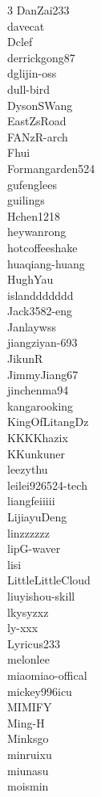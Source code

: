 \documentclass{article}
\begin{document}
\begin{multicols}{3}
DanZai233\\
davecat\\
Dclef\\
derrickgong87\\
dglijin-oss\\
dull-bird\\
DysonSWang\\
EastZsRoad\\
FANzR-arch\\
Fhui\\
Formangarden524\\
gufenglees\\
guilings\\
Hchen1218\\
heywanrong\\
hotcoffeeshake\\
huaqiang-huang\\
HughYau\\
islanddddddd\\
Jack3582-eng\\
Janlaywss\\
jiangziyan-693\\
JikunR\\
JimmyJiang67\\
jinchenma94\\
kangarooking\\
KingOfLitangDz\\
KKKKhazix\\
KKunkuner\\
leezythu\\
leilei926524-tech\\
liangfeiiiii\\
LijiayuDeng\\
linzzzzzz\\
lipG-waver\\
lisi\\
LittleLittleCloud\\
liuyishou-skill\\
lkysyzxz\\
ly-xxx\\
Lyricus233\\
melonlee\\
miaomiao-offical\\
mickey996icu\\
MIMIFY\\
Ming-H\\
Minksgo\\
minruixu\\
miunasu\\
moismin\\

\end{multicols}
\end{document}
